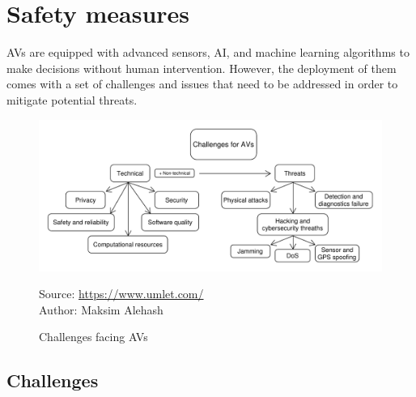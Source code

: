 \documentclass[10pt,oneside,english,a4paper]{article}
\begin{document}

\section{Safety measures} \label{safety}
\par AVs are equipped with advanced sensors, AI, and machine learning algorithms to make decisions without human intervention. However, the deployment of them comes with a set of challenges and issues that need to be addressed in order to mitigate potential threats.

\begin{figure}[!h]
\centering
\includegraphics[scale=0.5]{challenges.pdf}
\caption{Challenges facing AVs}
{Source: \url{https://www.umlet.com/}}\\
{Author: Maksim Alehash}
\label{fig:p_challenges}
\end{figure}

\subsection{Challenges}
\end{document}
